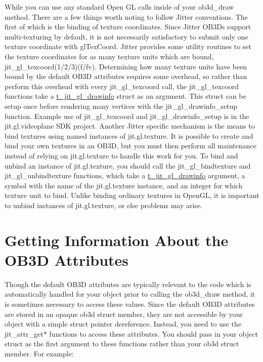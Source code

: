 While you can use any standard Open GL calls inside of your ob3d\_\-draw method. There are a few things worth noting to follow Jitter conventions. The first of which is the binding of texture coordinates. Since Jitter OB3Ds support multi-\/texturing by default, it is not necessarily satisfactory to submit only one texture coordinate with glTexCoord. Jitter provides some utility routines to set the texture coordinates for as many texture units which are bound, jit\_\-gl\_\-texcoord(1/2/3)(f/fv). Determining how many texture units have been bound by the default OB3D attributes requires some overhead, so rather than perform this overhead with every jit\_\-gl\_\-texcoord call, the jit\_\-gl\_\-texcoord functions take a \hyperlink{structt__jit__gl__drawinfo}{t\_\-jit\_\-gl\_\-drawinfo} struct as an argument. This struct can be setup once before rendering many vertices with the jit\_\-gl\_\-drawinfo\_\-setup function. Example use of jit\_\-gl\_\-texcoord and jit\_\-gl\_\-drawinfo\_\-setup is in the jit.gl.videoplane SDK project. Another Jitter specific mechanism is the means to bind textures using named instances of jit.gl.texture. It is possible to create and bind your own textures in an OB3D, but you must then perform all maintenance instead of relying on jit.gl.texture to handle this work for you. To bind and unbind an instance of jit.gl.texture, you should call the jit\_\-gl\_\-bindtexture and jit\_\-gl\_\-unbindtexture functions, which take a \hyperlink{structt__jit__gl__drawinfo}{t\_\-jit\_\-gl\_\-drawinfo} argument, a symbol with the name of the jit.gl.texture instance, and an integer for which texture unit to bind. Unlike binding ordinary textures in OpenGL, it is important to unbind instances of jit.gl.texture, or else problems may arise.\hypertarget{chapter_jit_ob3ddetails_chapter_jit_ob3ddetails_attrinfo}{}\section{Getting Information About the OB3D Attributes}\label{chapter_jit_ob3ddetails_chapter_jit_ob3ddetails_attrinfo}
Though the default OB3D attributes are typically relevant to the code which is automatically handled for your object prior to calling the ob3d\_\-draw method, it is sometimes necessary to access these values. Since the default OB3D attributes are stored in an opaque ob3d struct member, they are not accessible by your object with a simple struct pointer dereference. Instead, you need to use the jit\_\-attr\_\-get$\ast$ functions to access these attributes. You should pass in your object struct as the first argument to these functions rather than your ob3d struct member. For example:


